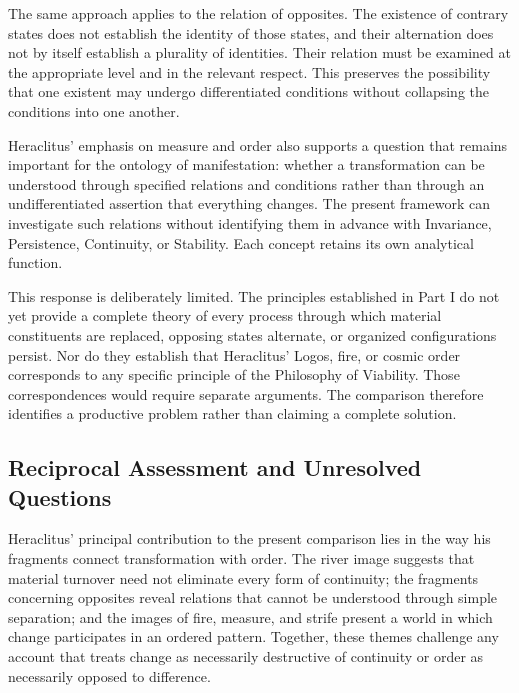 \label{para:VS.B01.P01.C08.S03.SS09.P003}

The same approach applies to the relation of
opposites. The existence of contrary states
does not establish the identity of those states,
and their alternation does not by itself
establish a plurality of identities. Their
relation must be examined at the appropriate
level and in the relevant respect. This
preserves the possibility that one existent
may undergo differentiated conditions without
collapsing the conditions into one another.

\label{para:VS.B01.P01.C08.S03.SS09.P004}

Heraclitus' emphasis on measure and order also
supports a question that remains important
for the ontology of manifestation: whether
a transformation can be understood through
specified relations and conditions rather
than through an undifferentiated assertion
that everything changes. The present framework
can investigate such relations without
identifying them in advance with Invariance,
Persistence, Continuity, or Stability. Each
concept retains its own analytical function.

\label{para:VS.B01.P01.C08.S03.SS09.P005}

This response is deliberately limited. The
principles established in Part I do not yet
provide a complete theory of every process
through which material constituents are
replaced, opposing states alternate, or
organized configurations persist. Nor do
they establish that Heraclitus' Logos,
fire, or cosmic order corresponds to any
specific principle of the Philosophy of
Viability. Those correspondences would
require separate arguments. The comparison
therefore identifies a productive problem
rather than claiming a complete solution.


\subsection{Reciprocal Assessment and Unresolved Questions}

\label{para:VS.B01.P01.C08.S03.SS10.P001}

Heraclitus' principal contribution to the present
comparison lies in the way his fragments connect
transformation with order. The river image
suggests that material turnover need not
eliminate every form of continuity; the
fragments concerning opposites reveal
relations that cannot be understood through
simple separation; and the images of fire,
measure, and strife present a world in which
change participates in an ordered pattern.
Together, these themes challenge any account
that treats change as necessarily destructive
of continuity or order as necessarily opposed
to difference.

